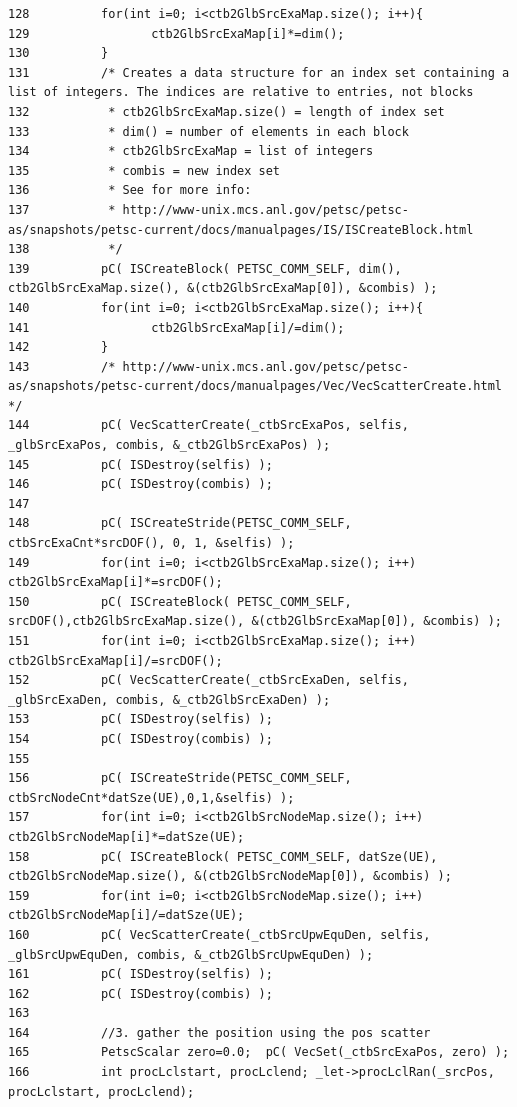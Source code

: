 \begin{verbatim}
128          for(int i=0; i<ctb2GlbSrcExaMap.size(); i++){
129                 ctb2GlbSrcExaMap[i]*=dim();
130          }
131          /* Creates a data structure for an index set containing a list of integers. The indices are relative to entries, not blocks
132           * ctb2GlbSrcExaMap.size() = length of index set
133           * dim() = number of elements in each block
134           * ctb2GlbSrcExaMap = list of integers
135           * combis = new index set
136           * See for more info: 
137           * http://www-unix.mcs.anl.gov/petsc/petsc-as/snapshots/petsc-current/docs/manualpages/IS/ISCreateBlock.html
138           */
139          pC( ISCreateBlock( PETSC_COMM_SELF, dim(), ctb2GlbSrcExaMap.size(), &(ctb2GlbSrcExaMap[0]), &combis) );
140          for(int i=0; i<ctb2GlbSrcExaMap.size(); i++){
141                 ctb2GlbSrcExaMap[i]/=dim();
142          }
143          /* http://www-unix.mcs.anl.gov/petsc/petsc-as/snapshots/petsc-current/docs/manualpages/Vec/VecScatterCreate.html */
144          pC( VecScatterCreate(_ctbSrcExaPos, selfis, _glbSrcExaPos, combis, &_ctb2GlbSrcExaPos) );
145          pC( ISDestroy(selfis) );
146          pC( ISDestroy(combis) );
147          
148          pC( ISCreateStride(PETSC_COMM_SELF, ctbSrcExaCnt*srcDOF(), 0, 1, &selfis) );
149          for(int i=0; i<ctb2GlbSrcExaMap.size(); i++) ctb2GlbSrcExaMap[i]*=srcDOF();
150          pC( ISCreateBlock( PETSC_COMM_SELF, srcDOF(),ctb2GlbSrcExaMap.size(), &(ctb2GlbSrcExaMap[0]), &combis) );
151          for(int i=0; i<ctb2GlbSrcExaMap.size(); i++) ctb2GlbSrcExaMap[i]/=srcDOF();
152          pC( VecScatterCreate(_ctbSrcExaDen, selfis, _glbSrcExaDen, combis, &_ctb2GlbSrcExaDen) );
153          pC( ISDestroy(selfis) );
154          pC( ISDestroy(combis) );
155          
156          pC( ISCreateStride(PETSC_COMM_SELF, ctbSrcNodeCnt*datSze(UE),0,1,&selfis) );
157          for(int i=0; i<ctb2GlbSrcNodeMap.size(); i++) ctb2GlbSrcNodeMap[i]*=datSze(UE);
158          pC( ISCreateBlock( PETSC_COMM_SELF, datSze(UE), ctb2GlbSrcNodeMap.size(), &(ctb2GlbSrcNodeMap[0]), &combis) );
159          for(int i=0; i<ctb2GlbSrcNodeMap.size(); i++) ctb2GlbSrcNodeMap[i]/=datSze(UE);
160          pC( VecScatterCreate(_ctbSrcUpwEquDen, selfis, _glbSrcUpwEquDen, combis, &_ctb2GlbSrcUpwEquDen) );
161          pC( ISDestroy(selfis) );
162          pC( ISDestroy(combis) );
163          
164          //3. gather the position using the pos scatter
165          PetscScalar zero=0.0;  pC( VecSet(_ctbSrcExaPos, zero) );
166          int procLclstart, procLclend; _let->procLclRan(_srcPos, procLclstart, procLclend);

\end{verbatim}
